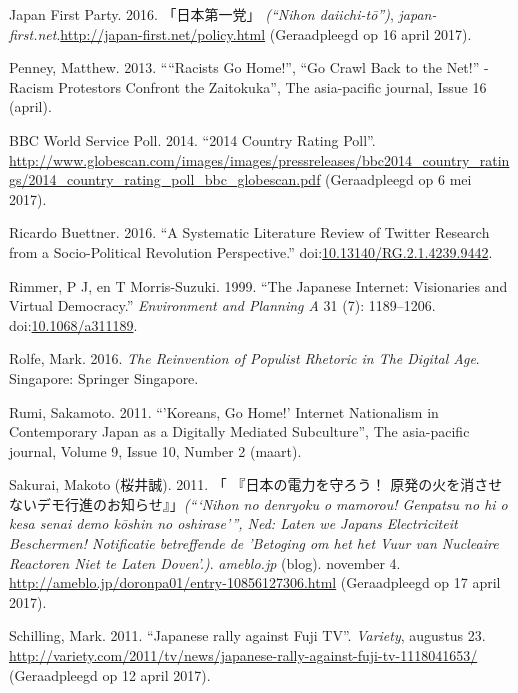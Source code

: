 \documentclass[10.5pt,dutch,]{article}
\begin{document}
\hypertarget{ref-japanux5ffirstux5fpartyux5fjapanux5f2016}{}
Japan First Party. 2016. 「日本第一党」 \emph{(“Nihon daiichi-tō”)}, \emph{japan-first.net}.\url{http://japan-first.net/policy.html} (Geraadpleegd op 16 april 2017).

\hypertarget{ref-penneyux5fracistsux5f2013}{}
Penney, Matthew. 2013. “``Racists Go Home!'', ``Go Crawl Back to the
Net!'' -Racism Protestors Confront the Zaitokuka”, The asia-pacific
journal, Issue 16 (april).

\hypertarget{ref-bbcux5fworldux5fserviceux5fpollux5f2014ux5f2014}{}
BBC World Service Poll. 2014. “2014 Country Rating Poll”. \url{http://www.globescan.com/images/images/pressreleases/bbc2014_country_ratings/2014_country_rating_poll_bbc_globescan.pdf} (Geraadpleegd op 6 mei 2017).

\hypertarget{ref-ricardoux5fbuettnerux5fsystematicux5f2016}{}
Ricardo Buettner. 2016. “A Systematic Literature Review of Twitter
Research from a Socio-Political Revolution Perspective.”
doi:\href{https://doi.org/10.13140/RG.2.1.4239.9442}{10.13140/RG.2.1.4239.9442}.

\hypertarget{ref-rimmerux5fjapaneseux5f1999}{}
Rimmer, P J, en T Morris-Suzuki. 1999. “The Japanese Internet:
Visionaries and Virtual Democracy.” \emph{Environment and Planning A} 31
(7): 1189--1206.
doi:\href{https://doi.org/10.1068/a311189}{10.1068/a311189}.

\hypertarget{ref-rolfeux5freinventionux5f2016}{}
Rolfe, Mark. 2016. \emph{The Reinvention of Populist Rhetoric in The
Digital Age}. Singapore: Springer Singapore.

\hypertarget{ref-rumiux5fkoreansux5f2011}{}
Rumi, Sakamoto. 2011. “'Koreans, Go Home!' Internet Nationalism in
Contemporary Japan as a Digitally Mediated Subculture”, The asia-pacific journal, Volume 9,
Issue 10, Number 2 (maart).

\hypertarget{ref-sakuraiux5fnihonux5f2011}{}
Sakurai, Makoto (桜井誠). 2011. 「 『日本の電力を守ろう！ 原発の火を消させないデモ行進のお知らせ』」\emph{(“‘Nihon no denryoku o mamorou! Genpatsu no hi o kesa senai demo kōshin no oshirase’”, Ned:  Laten we Japans Electriciteit Beschermen! Notificatie betreffende de 'Betoging om het het Vuur van Nucleaire Reactoren Niet te Laten Doven'.)}. \emph{ameblo.jp} (blog). november 4. \url{http://ameblo.jp/doronpa01/entry-10856127306.html} (Geraadpleegd op 17 april 2017).

\hypertarget{ref-schillingux5fjapaneseux5f2011}{}
Schilling, Mark. 2011. “Japanese rally against Fuji TV”. \emph{Variety}, augustus 23. \url{http://variety.com/2011/tv/news/japanese-rally-against-fuji-tv-1118041653/} (Geraadpleegd op 12 april 2017).
\end{document}
